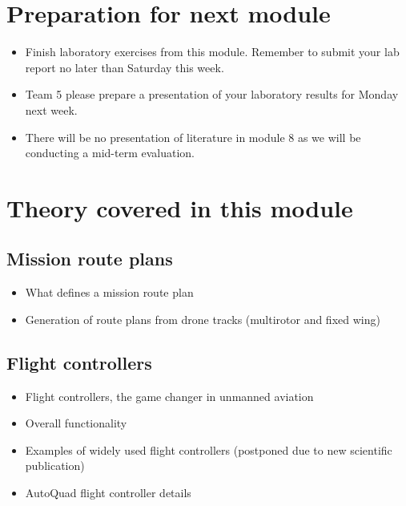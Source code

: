 \documentclass[a4paper,10pt,fleqn]{article}
\begin{document}
\section{Preparation for next module}

\begin{itemize}

\item Finish laboratory exercises from this module. Remember to submit your lab report no later than Saturday this week.

\item Team 5 please prepare a presentation of your laboratory results for Monday next week.

\item There will be no presentation of literature in module 8 as we will be conducting a mid-term evaluation.



\end{itemize}


\section{Theory covered in this module}

\subsection{Mission route plans}

\begin{itemize}
\item What defines a mission route plan
\item Generation of route plans from drone tracks (multirotor and fixed wing)
\end{itemize}

\subsection{Flight controllers}

\begin{itemize}
\item Flight controllers, the game changer in unmanned aviation 
\item Overall functionality
\item Examples of widely used flight controllers (postponed due to new scientific publication)
\item AutoQuad flight controller details
\end{itemize}
\end{document}
